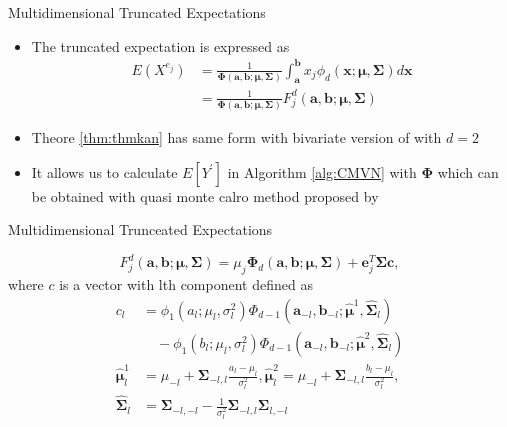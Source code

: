 \begin{frame}{Multidimensional Truncated Expectations}

\begin{itemize}
	\item The truncated expectation is expressed as
	\begin{align*}
		E(X^{e_j})
		&=\frac{1}{\boldsymbol{\Phi}(\mathbf{a},\mathbf{b};\boldsymbol{\mu},\boldsymbol{\Sigma})}\int_\mathbf{a}^\mathbf{b}x_j\phi_d(\mathbf{x};\boldsymbol{\mu},\boldsymbol{\Sigma})d\mathbf{x}\\
		&=\frac{1}{\boldsymbol{\Phi}(\mathbf{a},\mathbf{b};\boldsymbol{\mu},\boldsymbol{\Sigma})}F_j^d(\mathbf{a},\mathbf{b};\boldsymbol{\mu},\boldsymbol{\Sigma})
	\end{align*}
	\item Theore \ref{thm:thmkan} has same form with bivariate version of \citet{trinh2015bivariate} with $d=2$ 
	\item It allows us to calculate $E[Y^\prime]$ in Algorithm \ref{alg:CMVN} with $\boldsymbol{\Phi}$ which can be obtained with quasi monte calro method proposed by \citet{genz1992numerical}
\end{itemize}

\end{frame}

\begin{frame}{Multidimensional Trunceated Expectations}
	\begin{theorem}{\citet{kan2017moments}}
		\label{thm:thmkan}
		$$F_j^d(\mathbf{a},\mathbf{b};\boldsymbol{\mu},\boldsymbol{\Sigma})= \mu_j\boldsymbol{\Phi}_d(\mathbf{a},\mathbf{b};\boldsymbol{\mu},\boldsymbol{\Sigma})+\mathbf{e}_j^T\boldsymbol{\Sigma}\mathbf{c},$$
		where $c$ is a vector with lth component defined as
		$$\begin{aligned}
		c_l&=\phi_1(a_l;\mu_l,\sigma_l^2)\Phi_{d-1}(\mathbf{a}_{-l},\mathbf{b}_{-l};\boldsymbol{\hat{\mu}}^1, \hat{\boldsymbol{\Sigma}}_l) \\
		&\quad -\phi_1(b_l;\mu_l,\sigma_l^2)\Phi_{d-1}(\mathbf{a}_{-l},\mathbf{b}_{-l};\boldsymbol{\hat{\mu}}^2, \hat{\boldsymbol{\Sigma}}_l)\\
		\boldsymbol{\hat{\mu}}^1_l&=\mu_{-l}+\boldsymbol{\Sigma}_{-l,l}\frac{a_l-\mu_l}{\sigma_l^2},
		\boldsymbol{\hat{\mu}}^2_l=\mu_{-l}+\boldsymbol{\Sigma}_{-l,l}\frac{b_l-\mu_l}{\sigma_l^2},\\
		\hat{\boldsymbol{\Sigma}}_l&=\boldsymbol{\Sigma}_{-l,-l} -\frac{1}{\sigma_l^2}\boldsymbol{\Sigma}_{-l,l}\boldsymbol{\Sigma}_{l,-l}
		\end{aligned}$$
	\end{theorem}
\end{frame}

